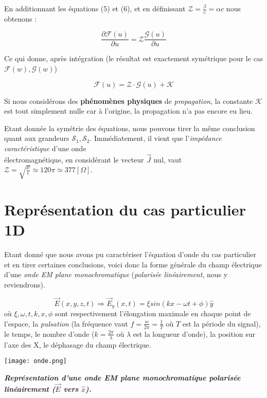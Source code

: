 En additionnant les équations (5) et (6), et en définissant $\mathcal{Z} = \frac{\beta}{c} = \alpha c$ nous obtenons : 

\begin{equation}
 \frac{\partial \mathcal{F}(u)}{\partial u} =  \mathcal{Z} \frac{\mathcal{G}(u)}{\partial u}
\end{equation}

Ce qui donne, après intégration (le résultat est exactement symétrique pour le cas $\mathcal{F}(w), \mathcal{G}(w)$) 

\[\mathcal{F}(u) = \mathcal{Z} \cdot \mathcal{G}(u) + \mathcal{K}\]

Si nous considérons des \textbf{phénomènes physiques} de \textit{propagation}, la constante $\mathcal{K}$ est tout simplement nulle car 
à l'origine, la propagation n'a pas encore eu lieu. 


Etant donnée la symétrie des équations, nous pouvons tirer la même conclusion quant aux grandeurs $\mathcal{S}_{1},\mathcal{S}_{2}$. 
Immédiatement, il vient que l'\textit{impédance caractéristique} d'une onde\\ électromagnétique, en considérant le vecteur $\vec{J}$ nul, vaut 
$\mathcal{Z} = \sqrt{\frac{\mu}{\epsilon}} \simeq120 \pi \simeq 377 [\Omega] $. 

\section{Représentation du cas particulier 1D}

Etant donné que nous avons pu caractériser l'équation d'onde du cas particulier et en tirer certaines conclusions, 
voici donc la forme générale du champ électrique d'une \textit{onde EM plane monochromatique} (\textit{polarisée linéairement}, nous y reviendrons).

\[\vec{E}(x,y,z,t) \Rightarrow \vec{E}_{y}(x,t) = \xi sin(k x - \omega t + \phi) \hat{y} \]
où $\xi,\omega,t,k,x,\phi$ sont respectivement l'élongation maximale en chaque point de l'espace, la \textit{pulsation} (la fréquence  vaut $f = \frac{w}{2 \pi} = \frac{1}{T}$ où $T$ 
est la période du signal), le temps, le nombre d'onde ($k = \frac{2\pi}{\lambda}$ où $\lambda$ est la longueur d'onde), la position sur l'axe des X, le déphasage  du champ électrique. 
\begin{marginfigure}
\texttt{[image: onde.png]}
\caption{\textit{\textbf{Représentation d'une onde EM plane monochromatique polarisée linéairement ($\vec{E}$ vers $\hat{x}$).}}}
\end{marginfigure}

